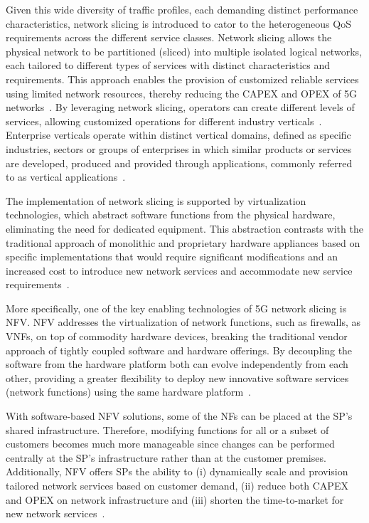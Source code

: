 Given this wide diversity of traffic profiles, each demanding distinct performance characteristics, network slicing is introduced to cator to the heterogeneous \ac{QoS} requirements across the different service classes. Network slicing allows the physical network to be partitioned (sliced) into multiple isolated logical networks, each tailored to different types of services with distinct characteristics and requirements. This approach enables the provision of customized reliable services using limited network resources, thereby reducing the \ac{CAPEX} and \ac{OPEX} of \ac{5G} networks~\cite{networkSlicingBased5GFutureMobileNetworks}. By leveraging network slicing, operators can create different levels of services, allowing customized operations for different industry verticals~\cite{NetworkSlicingUseCasesGSMA}. Enterprise verticals operate within distinct vertical domains, defined as specific industries, sectors or groups of enterprises in which similar products or services are developed, produced and provided through applications, commonly referred to as vertical applications~\cite{SEAL5GVerticals}.

The implementation of network slicing is supported by virtualization technologies, which abstract software functions from the physical hardware, eliminating the need for dedicated equipment. This abstraction contrasts with the traditional approach of monolithic and proprietary hardware appliances based on specific implementations that would require significant modifications and an increased cost to introduce new network services and accommodate new service requirements~\cite{networkSlicingOverview}.

More specifically, one of the key enabling technologies of \ac{5G} network slicing is \ac{NFV}. \ac{NFV} addresses the virtualization of network functions, such as firewalls, as \acp{VNF}, on top of commodity hardware devices, breaking the traditional vendor approach of tightly coupled software and hardware offerings. By decoupling the software from the hardware platform both can evolve independently from each other, providing a greater flexibility to deploy new innovative software services (network functions) using the same hardware platform~\cite{slicingUsingSdnNfvTaxonomy}. 

With software-based \ac{NFV} solutions, some of the \acp{NF} can be placed at the \ac{SP}'s shared infrastructure. Therefore, modifying functions for all or a subset of customers becomes much more manageable since changes can be performed centrally at the \ac{SP}'s infrastructure rather than at the customer premises. Additionally, \ac{NFV} offers \acp{SP} the ability to (i) dynamically scale and provision tailored network services based on customer demand, (ii) reduce both \ac{CAPEX} and \ac{OPEX} on network infrastructure and (iii) shorten the time-to-market for new network services~\cite{slicingUsingSdnNfvTaxonomy}.

